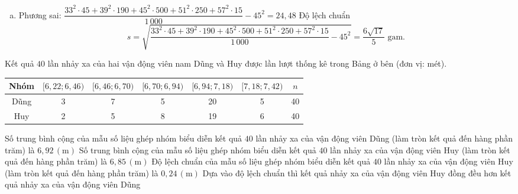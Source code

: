 \begin{ex}
{\begin{enumerate}[a)]
\begin{center}
\begin{tabular}{|l|c|c|c|c|c|}
					      \hline \hline
				      \end{tabular}
			      \end{center}
			      Khối lượng trung bình $$\overline{x}= \dfrac{33 \cdot 45 + 39 \cdot 190 + 45 \cdot 500 + 51 \cdot 250 + 57 \cdot 15}{1\, 000}= 45\text{ gam}.$$
			\item Phương sai: $\dfrac{33^2 \cdot 45 + 39^2 \cdot 190 + 45^2 \cdot 500 + 51^2 \cdot 250 + 57^2 \cdot 15}{1\, 000} - 45^2=24{,}48$
			      Độ lệch chuẩn $$s= \sqrt{\dfrac{33^2 \cdot 45 + 39^2 \cdot 190 + 45^2 \cdot 500 + 51^2 \cdot 250 + 57^2 \cdot 15}{1\, 000} - 45^2} =\dfrac{6\sqrt{17}}{5} \text{ gam}.$$
		\end{enumerate}
	}
\end{ex}

\begin{ex}
	Kết quả $ 40 $ lần nhảy xa của hai vận động viên nam Dũng và Huy được lần lượt thống kê trong Bảng ở bên (đơn vị: mét).
	\begin{center}
		\begin{tabular}{|c|c|c|c|c|c|c|}
			\hline
			Nhóm & $[6,22; 6,46)$ & $[6,46; 6,70)$ & $[6,70; 6,94)$ & $[6,94; 7,18)$ & $[7,18; 7,42)$ & $n$ \\
			\hline
			Dũng & 3              & 7              & 5              & 20             & 5              & 40  \\
			\hline
			Huy  & 2              & 5              & 8              & 19             & 6              & 40  \\
			\hline
		\end{tabular}
	\end{center}
	\choiceTF
	{\True Số trung bình cộng của mẫu số liệu ghép nhóm biểu diễn kết quả $ 40 $ lần nhảy xa của vận động viên Dũng (làm tròn kết quả đến hàng phần trăm) là $6,92\,(\mathrm{m})$}
	{Số trung bình cộng của mẫu số liệu ghép nhóm biểu diễn kết quả $ 40 $ lần nhảy xa của vận động viên Huy (làm tròn kết quả đến hàng phần trăm) là $6,85\,(\mathrm{m})$}
	{\True Độ lệch chuẩn của mẫu số liệu ghép nhóm biểu diễn kết quả $ 40 $ lần nhảy xa của vận động viên Huy (làm tròn kết quả đến hàng phần trăm) là $0,24\,(\mathrm{m})$}
	{\True Dựa vào độ lệch chuẩn thì kết quả nhảy xa của vận động viên Huy đồng đều hơn kết quả nhảy xa của vận động viên Dũng}


\end{ex}
